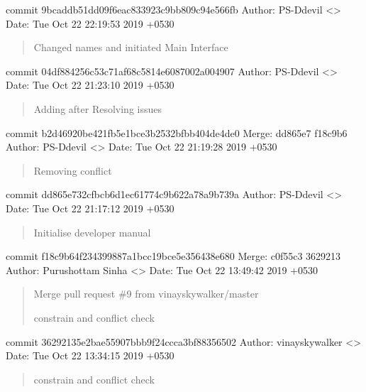\documentclass[letterpaper,10pt,english]{sphinxmanual}
\begin{document}
commit 9bcaddb51dd09f6eac833923c9bb809c94e566fb
Author: PS-Ddevil \textless{}\textgreater{}
Date:   Tue Oct 22 22:19:53 2019 +0530
\begin{quote}

Changed names and initiated Main Interface
\end{quote}

commit 04df884256c53c71af68c5814e6087002a004907
Author: PS-Ddevil \textless{}\textgreater{}
Date:   Tue Oct 22 21:23:10 2019 +0530
\begin{quote}

Adding after Resolving issues
\end{quote}

commit b2d46920be421fb5e1bce3b2532bfbb404de4de0
Merge: dd865e7 f18c9b6
Author: PS-Ddevil \textless{}\textgreater{}
Date:   Tue Oct 22 21:19:28 2019 +0530
\begin{quote}

Removing conflict
\end{quote}

commit dd865e732cfbcb6d1ec61774c9b622a78a9b739a
Author: PS-Ddevil \textless{}\textgreater{}
Date:   Tue Oct 22 21:17:12 2019 +0530
\begin{quote}

Initialise developer manual
\end{quote}

commit f18c9b64f234399887a1bcc19bce5e356438e680
Merge: c0f55c3 3629213
Author: Purushottam Sinha \textless{}\textgreater{}
Date:   Tue Oct 22 13:49:42 2019 +0530
\begin{quote}

Merge pull request \#9 from vinayskywalker/master

constrain and conflict check
\end{quote}

commit 36292135e2bae55907bbb9f24ccca3bf88356502
Author: vinayskywalker \textless{}\textgreater{}
Date:   Tue Oct 22 13:34:15 2019 +0530
\begin{quote}

constrain and conflict check
\end{quote}
\end{document}

